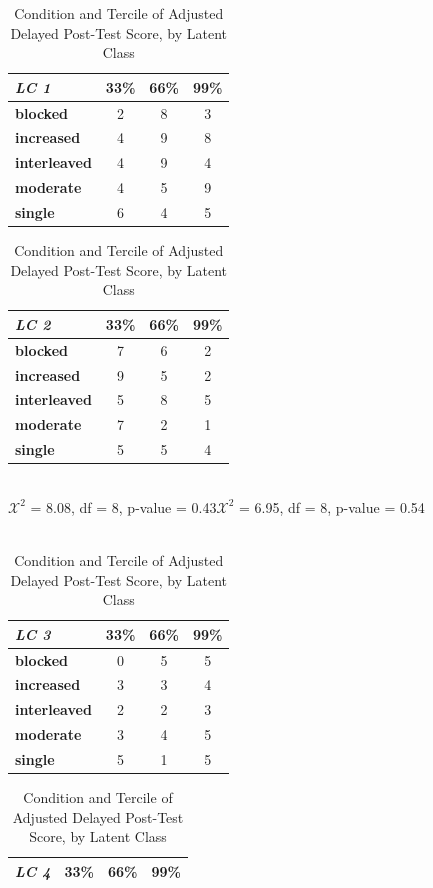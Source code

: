 \documentclass{edm_template}
\begin{document}
\begin{table}[htbp]
\caption{Condition and Tercile of Adjusted Delayed Post-Test Score, by Latent Class  }
 \begin{center}
\begin{tabular}{|l || c | c | c |}
\hline
\emph{LC 1}&33\%&66\%&99\%\\ \hline \hline
  \textbf{blocked}&      2&  8& 3\\ \hline
\textbf{increased}&    4&  9&  8 \\ \hline
  \textbf{interleaved}&  4&  9&  4 \\ \hline
     \textbf{moderate}&     4&  5& 9 \\ \hline
       \textbf{single}&       6&  4&  5 \\ \hline
 \end{tabular}
\label{default}
\begin{tabular}{|l || c | c | c |}
\hline
\emph{LC 2}&33\%&66\%&99\%\\ \hline \hline
  \textbf{blocked}&      7&  6& 2 \\ \hline
\textbf{increased}&    9&  5&  2 \\ \hline
  \textbf{interleaved}&  5&  8&  5 \\ \hline
     \textbf{moderate}&     7&  2& 1 \\ \hline
       \textbf{single}&       5&  5&  4 \\ \hline
 \end{tabular}
\\$\mathcal{X}^2$ = 8.08, df = 8, p-value = 0.43\hspace{15pt}$\mathcal{X}^2$ = 6.95, df = 8, p-value = 0.54\\ \hspace{0pt} \\
\label{default}
\begin{tabular}{|l || c | c | c |}
\hline
\emph{LC 3}&33\%&66\%&99\%\\ \hline \hline
  \textbf{blocked}&      0&  5& 5 \\ \hline
\textbf{increased}&    3&  3&  4 \\ \hline
  \textbf{interleaved}&  2&  2&  3 \\ \hline
     \textbf{moderate}&     3&  4& 5 \\ \hline
       \textbf{single}&       5& 1&  5 \\ \hline
 \end{tabular}
\begin{tabular}{|l || c | c | c |}
\hline
\emph{LC 4}&33\%&66\%&99\%\\ \hline \hline

\end{tabular}
\end{center}
\end{table}
\end{document}
